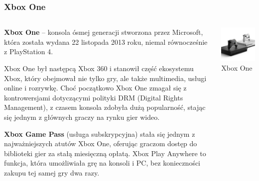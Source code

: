 \documentclass[8pt]{beamer}
\begin{document}
\begin{frame}
\frametitle{Xbox One}
\begin{columns}

\begin{column}{0.6\textwidth}
\textbf {Xbox One} –  konsola ósmej generacji stworzona przez Microsoft, która została wydana 22 listopada 2013 roku, niemal równocześnie z PlayStation 4. 

\vspace{0.5em} 
Xbox One był następcą Xbox 360 i stanowił część ekosystemu Xbox, który obejmował nie tylko gry, ale także multimedia, usługi online i rozrywkę. Choć początkowo Xbox One zmagał się z kontrowersjami dotyczącymi polityki DRM (Digital Rights Management), z czasem konsola zdobyła dużą popularność, stając się jednym z głównych graczy na rynku gier wideo.

\vspace{0.5em}
\textbf {Xbox Game Pass} (usługa subskrypcyjna) stała się jednym z najważniejszych atutów Xbox One, oferując graczom dostęp do biblioteki gier za stałą miesięczną opłatą. Xbox Play Anywhere to funkcja, która umożliwiała grę na konsoli i PC, bez konieczności zakupu tej samej gry dwa razy.

\end{column}

\begin{column}{0.35\textwidth}
        \centering
        \includegraphics[width=\textwidth]{xone.jpg} 
        {\small Xbox One} 
    \end{column}
\end{columns}

\end{frame}
\end{document}
